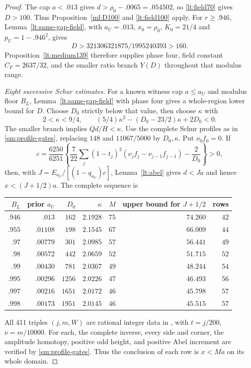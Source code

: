 \begin{proof}
The cap $a<.013$ gives $d>\rho_0-.0065=.054502$, so
\eqref{lt:field70} gives $D>100$.
Thus Proposition~\ref{mf:D100} and \eqref{lt:field100} apply.
For $r\ge.946$,
Lemma~\ref{lt:same-gap-field}, with $a_U=.013$, $x_0=\rho_0$,
$K_0=21/4$ and $p_U=1-.946^2$, gives
\[
 D>321306321875/1995240393>160.
\]
Proposition~\ref{lt:medium139} therefore supplies phase four,
field constant $C_F=2637/32$, and the smaller ratio branch $Y(D)$
throughout that modulus range.

\smallskip\noindent\emph{Eight successive Schur estimates.}
For a known witness cap $a\le a_U$ and modulus floor $B_L$,
Lemma~\ref{lt:same-gap-field} with phase four gives a whole-region
lower bound for $D$. Choose $D_0$ strictly below that value, then
choose $\kappa$ with
\[
 2<\kappa<9/4,\qquad
 (5/4)\kappa^2-(D_0-23/2)\kappa+2D_0<0.
\]
The smaller branch implies $Qd/H<\kappa$.
Use the complete Schur profiles as in
\eqref{sm:profile-gates}, replacing $148$ and $11067/5000$ by
$D_0,\kappa$. Put $\nu_0f_0=0$. If
\[
 c=\frac{6250}{6251}\left\{
 \frac7{22}\sum_j(1-t_j)^2(\nu_jf_j-\nu_{j-1}f_{j-1})
 -\frac2{D_0}\right\}>0,
\]
then, with $J=E_{a_U}/[(1-q_{a_U})c]$, Lemma~\ref{lt:abel}
gives $d<Ja$ and hence
$x<(J+1/2)a$. The complete sequence is
\begin{center}\small
\begin{tabular}{rrrrrrr}
\toprule
$B_L$&prior $a_U$&$D_0$&$\kappa$&$M$&upper bound for $J+1/2$&rows\\\midrule
$.946$&$.013$&$162$&$2.1928$&$75$&$74.260$&$42$\\
$.955$&$.01108$&$198$&$2.1545$&$67$&$66.009$&$44$\\
$.97$&$.00779$&$301$&$2.0985$&$57$&$56.441$&$49$\\
$.98$&$.00572$&$442$&$2.0659$&$52$&$51.715$&$52$\\
$.99$&$.00430$&$781$&$2.0367$&$49$&$48.244$&$54$\\
$.995$&$.00296$&$1256$&$2.0226$&$47$&$46.493$&$56$\\
$.997$&$.00216$&$1651$&$2.0172$&$46$&$45.798$&$57$\\
$.998$&$.00173$&$1951$&$2.0145$&$46$&$45.515$&$57$\\\bottomrule
\end{tabular}
\end{center}
All 411 triples $(j,m,W)$ are rational integer data in
, with $t=j/200$,
$\nu=m/10000$. For each, the complete inverse, every side and
corner, the amplitude homotopy, positive odd height, and positive
Abel increment are verified by \eqref{sm:profile-gates}.
Thus the conclusion of each row is $x<Ma$ on its whole domain.


\end{proof}
